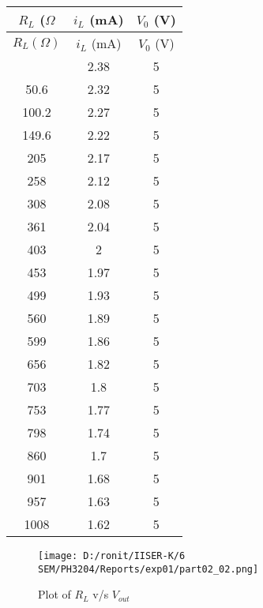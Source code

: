 \documentclass[12pt]{article}
\begin{document}
\begin{longtable}{|c|c|c|}
	\hline
	${R_L}$ (${\Omega}$ & ${i_L}$ (mA) & ${V_0}$ (V) \\ \hline
	\endfirsthead
	
	\hline
	${R_L}({\Omega})$ & ${i_L}$ (mA) & ${V_0}$ (V) \\ \hline
	\endhead
	
	\hline
	\endfoot
	
	\hline
	\endlastfoot
		1.1                     & 2.38              & 5                  \\ \hline
		50.6                    & 2.32              & 5                  \\ \hline
		100.2                   & 2.27              & 5                  \\ \hline
		149.6                   & 2.22              & 5                  \\ \hline
		205                     & 2.17              & 5                  \\ \hline
		258                     & 2.12              & 5                  \\ \hline
		308                     & 2.08              & 5                  \\ \hline
		361                     & 2.04              & 5                  \\ \hline
		403                     & 2                 & 5                  \\ \hline
		453                     & 1.97              & 5                  \\ \hline
		499                     & 1.93              & 5                  \\ \hline
		560                     & 1.89              & 5                  \\ \hline
		599                     & 1.86              & 5                  \\ \hline
		656                     & 1.82              & 5                  \\ \hline
		703                     & 1.8               & 5                  \\ \hline
		753                     & 1.77              & 5                  \\ \hline
		798                     & 1.74              & 5                  \\ \hline
		860                     & 1.7               & 5                  \\ \hline
		901                     & 1.68              & 5                  \\ \hline
		957                     & 1.63              & 5                  \\ \hline
		1008                    & 1.62              & 5                  \\ \hline
	\end{longtable}
\begin{figure}[H]  
	\centering  
	\texttt{[image: D:/ronit/IISER-K/6 SEM/PH3204/Reports/exp01/part02\_02.png]} 
	\caption{Plot of $R_L$ v/s $V_{out}$}  
	\label{fig:part01_01}  
  \end{figure}
\end{document}
